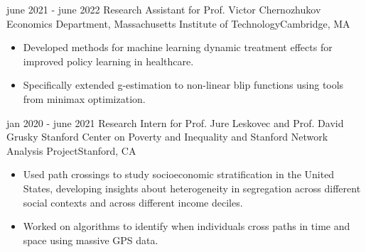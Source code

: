 \begin{cventries}
    \cventry
    {june 2021 - june 2022}
    {Research Assistant for Prof. Victor Chernozhukov}
    {Economics Department, Massachusetts Institute of Technology}{Cambridge, MA}
    {\vspace{-4mm}\begin{itemize}[leftmargin=5mm]
        \item  Developed methods for machine learning dynamic treatment effects for improved policy learning in healthcare. 
        \item Specifically extended g-estimation to non-linear blip functions using tools from minimax optimization.
    \end{itemize}}\vspace{-4mm}    
     

 \cventry
    {jan 2020 - june 2021}
    {Research Intern for Prof. Jure Leskovec and Prof. David Grusky}
    {Stanford Center on Poverty and Inequality and Stanford Network Analysis Project}{Stanford, CA}
    {\vspace{-4mm}\begin{itemize}[leftmargin=5mm]
       \item Used path crossings to study socioeconomic stratification in the United States, developing insights about heterogeneity in segregation across different social contexts and across different income deciles.
      \item Worked on algorithms to identify when individuals cross paths in time and space using massive GPS data.
     \end{itemize}}\vspace{-4mm}
    

\end{cventries}
